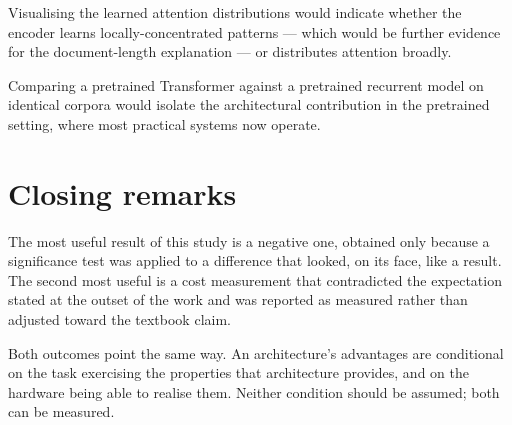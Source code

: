  Visualising the learned attention distributions would
indicate whether the encoder learns locally-concentrated patterns --- which would be further
evidence for the document-length explanation --- or distributes attention broadly.

 Comparing a pretrained Transformer against a pretrained recurrent model on
identical corpora would isolate the architectural contribution in the pretrained setting, where
most practical systems now operate.

\section{Closing remarks}

The most useful result of this study is a negative one, obtained only because a significance test
was applied to a difference that looked, on its face, like a result. The second most useful is a
cost measurement that contradicted the expectation stated at the outset of the work and was
reported as measured rather than adjusted toward the textbook claim.

Both outcomes point the same way. An architecture's advantages are conditional on the task
exercising the properties that architecture provides, and on the hardware being able to realise
them. Neither condition should be assumed; both can be measured.
